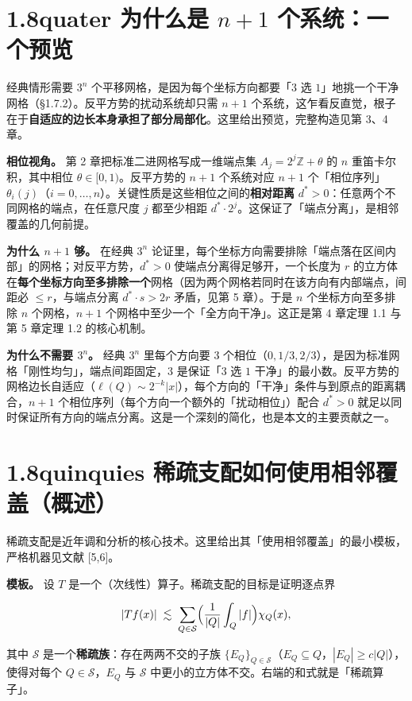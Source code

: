 \documentclass[a4paper,11pt,openany]{ctexbook}
\numberwithin{equation}{chapter}
\numberwithin{figure}{chapter}
\numberwithin{table}{chapter}
\begin{document}
\section{1.8quater 为什么是 $n+1$ 个系统：一个预览}

经典情形需要 $3^n$ 个平移网格，是因为每个坐标方向都要「$3$ 选 $1$」地挑一个干净网格（§1.7.2）。反平方势的扰动系统却只需 $n+1$ 个系统，这乍看反直觉，根子在于\textbf{自适应的边长本身承担了部分局部化}。这里给出预览，完整构造见第 3、4 章。

\textbf{相位视角。} 第 2 章把标准二进网格写成一维端点集 $A_j=2^j\mathbb Z+\theta$ 的 $n$ 重笛卡尔积，其中相位 $\theta\in[0,1)$。反平方势的 $n+1$ 个系统对应 $n+1$ 个「相位序列」$\theta_i(j)$（$i=0,\dots,n$）。关键性质是这些相位之间的\textbf{相对距离} $d^*>0$：任意两个不同网格的端点，在任意尺度 $j$ 都至少相距 $d^*\cdot 2^j$。这保证了「端点分离」，是相邻覆盖的几何前提。

\textbf{为什么 $n+1$ 够。} 在经典 $3^n$ 论证里，每个坐标方向需要排除「端点落在区间内部」的网格；对反平方势，$d^*>0$ 使端点分离得足够开，一个长度为 $r$ 的立方体在\textbf{每个坐标方向至多排除一个}网格（因为两个网格若同时在该方向有内部端点，间距必 $\le r$，与端点分离 $d^*\cdot s>2r$ 矛盾，见第 5 章）。于是 $n$ 个坐标方向至多排除 $n$ 个网格，$n+1$ 个网格中至少一个「全方向干净」。这正是第 4 章定理 1.1 与第 5 章定理 1.2 的核心机制。

\textbf{为什么不需要 $3^n$。} 经典 $3^n$ 里每个方向要 $3$ 个相位（$0,1/3,2/3$），是因为标准网格「刚性均匀」，端点间距固定，$3$ 是保证「$3$ 选 $1$ 干净」的最小数。反平方势的网格边长自适应（$\ell(Q)\sim2^{-k}|x|$），每个方向的「干净」条件与到原点的距离耦合，$n+1$ 个相位序列（每个方向一个额外的「扰动相位」）配合 $d^*>0$ 就足以同时保证所有方向的端点分离。这是一个深刻的简化，也是本文的主要贡献之一。

\section{1.8quinquies 稀疏支配如何使用相邻覆盖（概述）}

稀疏支配是近年调和分析的核心技术。这里给出其「使用相邻覆盖」的最小模板，严格机器见文献 [5,6]。

\textbf{模板。} 设 $T$ 是一个（次线性）算子。稀疏支配的目标是证明逐点界

$$|Tf(x)|\;\lesssim\; \sum_{Q\in\mathcal S}\Bigl(\frac1{|Q|}\int_Q |f|\Bigr)\chi_Q(x),$$

其中 $\mathcal S$ 是一个\textbf{稀疏族}：存在两两不交的子族 $\{E_Q\}_{Q\in\mathcal S}$（$E_Q\subseteq Q$，$|E_Q|\ge c|Q|$），使得对每个 $Q\in\mathcal S$，$E_Q$ 与 $\mathcal S$ 中更小的立方体不交。右端的和式就是「稀疏算子」。
\end{document}
